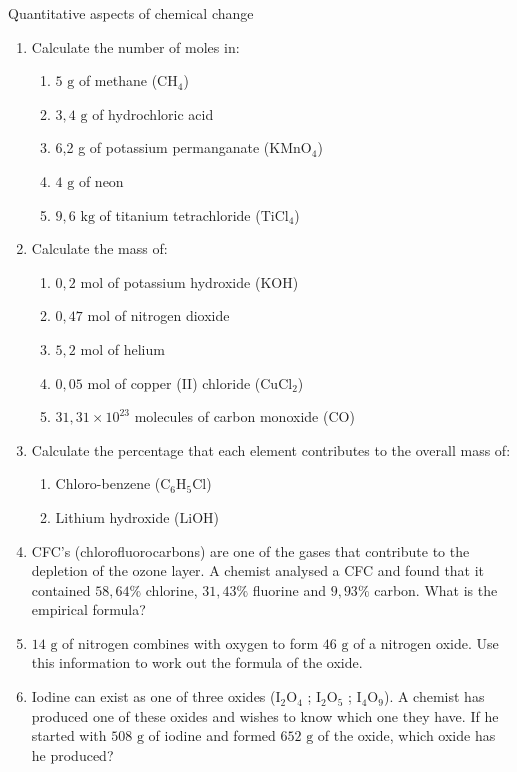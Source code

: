 \begin{eocexercises}{Quantitative aspects of chemical change}
\begin{enumerate}[noitemsep, label=\textbf{\arabic*}. ]
\item Calculate the number of moles in:
 \begin{enumerate}[noitemsep, label=\textbf{\alph*}. ] 
 \item $5 \text{ g}$ of methane (${\text{CH}}_{4}$)
 \item $3,4 \text{ g}$ of hydrochloric acid\item 6,2 g of potassium permanganate (${\text{KMnO}}_{4}$)
 \item $4 \text{ g}$ of neon
 \item $9,6 \text{ kg}$ of titanium tetrachloride (${\text{TiCl}}_{4}$)
 \end{enumerate}
\item Calculate the mass of:
 \begin{enumerate}[noitemsep, label=\textbf{\alph*}. ] 
 \item $0,2 \text{ mol}$ of potassium hydroxide ($\text{KOH}$)
 \item $0,47 \text{ mol}$ of nitrogen dioxide
 \item $5,2 \text{ mol}$ of helium
 \item $0,05 \text{ mol}$ of copper (II) chloride (${\text{CuCl}}_{2}$)
 \item $31,31 \times {10}^{23}$ molecules of carbon monoxide ($\text{CO}$)\end{enumerate}
\item Calculate the percentage that each element contributes to the overall mass of:
 \begin{enumerate}[noitemsep, label=\textbf{\alph*}. ] 
 \item Chloro-benzene (${\text{C}}_{6}{\text{H}}_{5}\text{Cl}$)
 \item Lithium hydroxide ($\text{LiOH}$)
 \end{enumerate}
\item CFC's (chlorofluorocarbons) are one of the gases that contribute to the depletion of the ozone layer. A chemist analysed a CFC and found that it contained $58,64\%$ chlorine, $31,43\%$ fluorine and $9,93\%$ carbon. What is the empirical formula?
\item $14 \text{ g}$ of nitrogen combines with oxygen to form $46 \text{ g}$ of a nitrogen oxide. Use this information to work out the formula of the oxide.
\item Iodine can exist as one of three oxides (${\text{I}}_{2}{\text{O}}_{4}$ ; ${\text{I}}_{2}{\text{O}}_{5}$ ; ${\text{I}}_{4}{\text{O}}_{9}$). A chemist has produced one of these oxides and wishes to know which one they have. If he started with $508 \text{ g}$ of iodine and formed $652 \text{ g}$ of the oxide, which oxide has he produced?

\end{enumerate}
\end{eocexercises}
